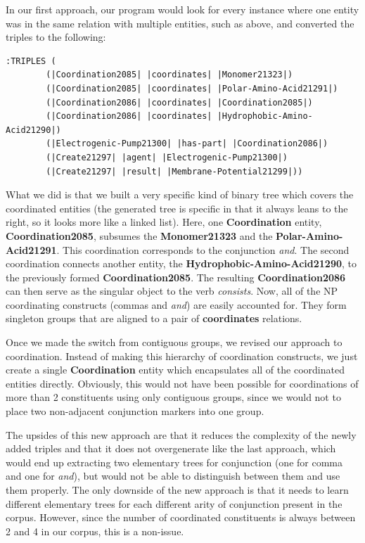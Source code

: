 \documentclass[a4paper]{article}
\begin{document}
In our first approach, our program would look for every instance where
one entity was in the same relation with multiple entities, such as
above, and converted the triples to the following:

\begin{verbatim}
:TRIPLES (
        (|Coordination2085| |coordinates| |Monomer21323|)
        (|Coordination2085| |coordinates| |Polar-Amino-Acid21291|)
        (|Coordination2086| |coordinates| |Coordination2085|)
        (|Coordination2086| |coordinates| |Hydrophobic-Amino-Acid21290|)
        (|Electrogenic-Pump21300| |has-part| |Coordination2086|)
        (|Create21297| |agent| |Electrogenic-Pump21300|)
        (|Create21297| |result| |Membrane-Potential21299|))
\end{verbatim}

What we did is that we built a very specific kind of binary tree which
covers the coordinated entities (the generated tree is specific in
that it always leans to the right, so it looks more like a linked
list). Here, one \textbf{Coordination} entity,
\textbf{Coordination2085}, subsumes the \textbf{Monomer21323} and the
\textbf{Polar-Amino-Acid21291}. This coordination corresponds to the
conjunction \emph{and}. The second coordination connects another
entity, the \textbf{Hydrophobic-Amino-Acid21290}, to the previously
formed \textbf{Coordination2085}. The resulting
\textbf{Coordination2086} can then serve as the singular object to the
verb \emph{consists}. Now, all of the NP coordinating constructs
(commas and \emph{and}) are easily accounted for. They form singleton
groups that are aligned to a pair of \textbf{coordinates} relations.

Once we made the switch from contiguous groups, we revised our
approach to coordination. Instead of making this hierarchy of
coordination constructs, we just create a single \textbf{Coordination}
entity which encapsulates all of the coordinated entities directly.
Obviously, this would not have been possible for coordinations of more
than 2 constituents using only contiguous groups, since we would not
to place two non-adjacent conjunction markers into one group.

The upsides of this new approach are that it reduces the complexity of
the newly added triples and that it does not overgenerate like the
last approach, which would end up extracting two elementary trees for
conjunction (one for comma and one for \emph{and}), but would not be
able to distinguish between them and use them properly. The only
downside of the new approach is that it needs to learn different
elementary trees for each different arity of conjunction present in
the corpus. However, since the number of coordinated constituents is
always between 2 and 4 in our corpus, this is a non-issue.
\end{document}
